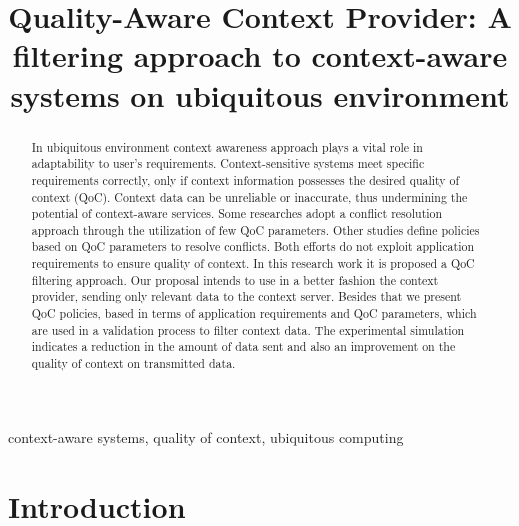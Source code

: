 \documentclass[letterpaper,conference]{IEEEtran}
\begin{document}
\title{Quality-Aware Context Provider: A filtering approach to context-aware systems on ubiquitous environment}
\author{
}

\maketitle

\begin{abstract}
In ubiquitous environment context awareness approach plays a vital role in adaptability
to user’s requirements. Context-sensitive systems meet specific requirements correctly, 
only if context information possesses the desired quality of context (QoC). Context data
can be unreliable or inaccurate, thus undermining the potential of context-aware 
services. Some researches adopt a conflict resolution approach through the utilization 
of few QoC parameters. Other studies define policies based on QoC parameters to resolve 
conflicts. Both efforts do not exploit application requirements to ensure quality of 
context. In this research work it is proposed a QoC filtering approach. Our proposal 
intends to use in a better fashion the context provider, sending only relevant data to 
the context server. Besides that we present QoC policies, based in terms of application 
requirements and QoC parameters, which are used in a validation process to filter 
context data. The experimental simulation indicates a reduction in the amount of data 
sent and also an improvement on the quality of context on transmitted data.
\end{abstract}

\begin{IEEEkeywords}
context-aware systems, quality of context, ubiquitous computing
\end{IEEEkeywords}

\IEEEpeerreviewmaketitle

\section{Introduction}
\end{document}
